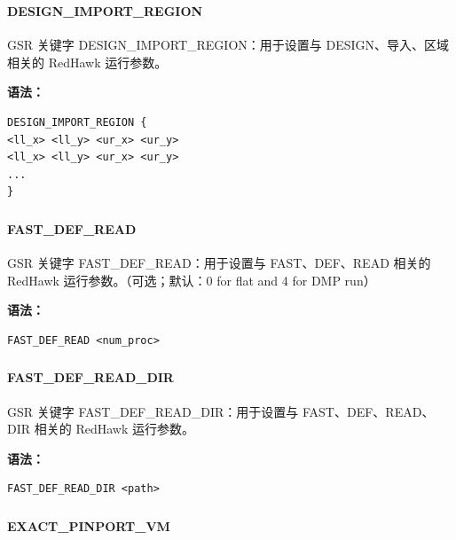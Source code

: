 \subsubsection{}
\paragraph*{DESIGN_IMPORT_REGION}

GSR 关键字 DESIGN_IMPORT_REGION：用于设置与 DESIGN、导入、区域 相关的 RedHawk 运行参数。

\textbf{语法：}
\begin{lstlisting}
DESIGN_IMPORT_REGION {
<ll_x> <ll_y> <ur_x> <ur_y>
<ll_x> <ll_y> <ur_x> <ur_y>
...
}
\end{lstlisting}

\subsubsection{}
\paragraph*{FAST_DEF_READ}

GSR 关键字 FAST_DEF_READ：用于设置与 FAST、DEF、READ 相关的 RedHawk 运行参数。（可选；默认：0 for flat and 4 for DMP run）

\textbf{语法：}
\begin{lstlisting}
FAST_DEF_READ <num_proc>
\end{lstlisting}

\subsubsection{}
\paragraph*{FAST_DEF_READ_DIR}

GSR 关键字 FAST_DEF_READ_DIR：用于设置与 FAST、DEF、READ、DIR 相关的 RedHawk 运行参数。

\textbf{语法：}
\begin{lstlisting}
FAST_DEF_READ_DIR <path>
\end{lstlisting}

\subsubsection{}
\paragraph*{EXACT_PINPORT_VM}

